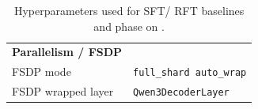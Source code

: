 \begin{table}[h!]
\begin{tabular}{p{5.5cm}p{7cm}}

\midrule
\textbf{Parallelism / FSDP} & \\
FSDP mode & \texttt{full\_shard auto\_wrap} \\
FSDP wrapped layer & \texttt{Qwen3DecoderLayer} \\

\bottomrule
\end{tabular}
\caption{Hyperparameters used for SFT/ RFT baselines and \ours{} \sft{} phase on \qwen{}.}
\label{tab:sft_hparams}
\end{table}